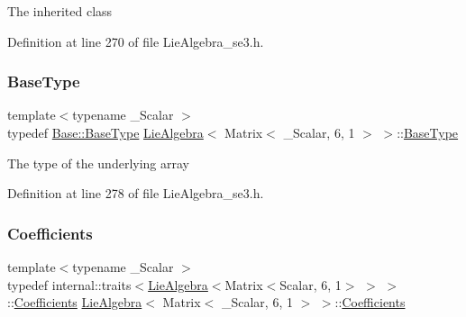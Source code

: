 The inherited class 

Definition at line 270 of file Lie\+Algebra\+\_\+se3.\+h.

\hypertarget{class_lie_algebra_3_01_matrix_3_01___scalar_00_016_00_011_01_4_01_4_aa86c8317cea5955c8ba9d0871791ea23}{}\label{class_lie_algebra_3_01_matrix_3_01___scalar_00_016_00_011_01_4_01_4_aa86c8317cea5955c8ba9d0871791ea23} 
\subsubsection{\texorpdfstring{Base\+Type}{BaseType}}
{\footnotesize\ttfamily template$<$typename \+\_\+\+Scalar $>$ \\
typedef \hyperlink{class_lie_algebra_base_ae7884e2973ffa35f8b209b2831a066a1}{Base\+::\+Base\+Type} \hyperlink{class_lie_algebra}{Lie\+Algebra}$<$ Matrix$<$ \+\_\+\+Scalar, 6, 1 $>$ $>$\+::\hyperlink{class_lie_algebra_3_01_matrix_3_01___scalar_00_016_00_011_01_4_01_4_aa86c8317cea5955c8ba9d0871791ea23}{Base\+Type}}

The type of the underlying array 

Definition at line 278 of file Lie\+Algebra\+\_\+se3.\+h.

\hypertarget{class_lie_algebra_3_01_matrix_3_01___scalar_00_016_00_011_01_4_01_4_a2eb9bb9a54a2c7ce0b75b46814ea390e}{}\label{class_lie_algebra_3_01_matrix_3_01___scalar_00_016_00_011_01_4_01_4_a2eb9bb9a54a2c7ce0b75b46814ea390e} 
\subsubsection{\texorpdfstring{Coefficients}{Coefficients}}
{\footnotesize\ttfamily template$<$typename \+\_\+\+Scalar $>$ \\
typedef internal\+::traits$<$\hyperlink{class_lie_algebra}{Lie\+Algebra}$<$Matrix$<$Scalar, 6, 1$>$ $>$ $>$\+::\hyperlink{class_lie_algebra_3_01_matrix_3_01___scalar_00_016_00_011_01_4_01_4_a2eb9bb9a54a2c7ce0b75b46814ea390e}{Coefficients} \hyperlink{class_lie_algebra}{Lie\+Algebra}$<$ Matrix$<$ \+\_\+\+Scalar, 6, 1 $>$ $>$\+::\hyperlink{class_lie_algebra_3_01_matrix_3_01___scalar_00_016_00_011_01_4_01_4_a2eb9bb9a54a2c7ce0b75b46814ea390e}{Coefficients}}

